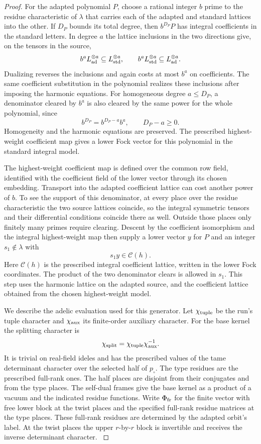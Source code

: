 \begin{proof}
For the adapted polynomial \(P\), choose a rational integer
\(b\) prime to the residue characteristic of \(\lambda\)
that carries each of the adapted and standard lattices
into the other. If \(D_P\) bounds its total degree, then
\(b^{D_P}P\) has integral coefficients in the standard
letters. In degree \(a\) the lattice inclusions in the two directions give, on the tensors in the source,
\[
 b^a L_{\rm ad}^{\otimes a}\subseteq L_{\rm std}^{\otimes a},
 \qquad b^a L_{\rm std}^{\otimes a}\subseteq L_{\rm ad}^{\otimes a}.
\]
Dualizing reverses the inclusions and again costs at most \(b^a\) on coefficients. The same coefficient substitution in the
polynomial realizes these inclusions after imposing the
harmonic equations. For homogeneous degree \(a\le D_P\), a denominator cleared by \(b^a\) is also cleared by the same power for the whole polynomial, since
\[
  b^{D_P}=b^{D_P-a}b^a,\qquad D_P-a\ge0.
\]
 Homogeneity and the harmonic
equations are preserved. The prescribed highest-weight coefficient map gives a lower Fock vector for this
polynomial in the standard integral model.

The highest-weight coefficient map is defined over the common row field, identified with the
coefficient field of the lower vector through its chosen
embedding. Transport into the adapted coefficient lattice
can cost another power of \(b\). To see the support of
this denominator, at every place over the residue
characteristic the two source lattices coincide, so the
integral symmetric tensors and their differential
conditions coincide there as well. Outside those places
only finitely many primes require clearing. Descent by
the coefficient isomorphism and the integral highest-weight
map then supply a lower vector \(y\) for \(P\) and an
integer \(s_1\notin\lambda\) with
\[
                 s_1 y\in\mathcal C(h).
\]
Here \(\mathcal C(h)\) is the prescribed integral coefficient lattice, written in the lower Fock coordinates. The
product of the two denominator clears is allowed in
\(s_1\). This step uses the harmonic lattice on the
adapted source, and the coefficient lattice obtained from
the chosen highest-weight model.
\label{cor:paired-off-prime-trace-3}

We describe the adelic evaluation used for this generator.
Let \(\chi_{\rm tuple}\) be the run's tuple character and
\(\chi_{\rm aux}\) its finite-order auxiliary character.
For the base kernel the splitting character is
\[
                    \chi_{\rm split}=\chi_{\rm tuple}\chi_{\rm aux}^{-1}.
\]
It is trivial on real-field ideles and has the prescribed values of the tame determinant character over the selected half of \(p_\circ\).
The type residues are the prescribed full-rank ones. The half
places are disjoint from their conjugates and from the
type places. The self-dual frames give the base kernel
as a product of a vacuum and the indicated residue
functions. Write \(\Phi_{\rm fr}\) for the finite vector
with free lower block at the twist places and the
specified full-rank residue matrices at the type places.
These full-rank residues are determined by the adapted
orbit's label. At the twist places the upper \(r\)-by-\(r\)
block is invertible and receives the inverse determinant
character.
\label{cor:paired-off-prime-trace-4}


\end{proof}
